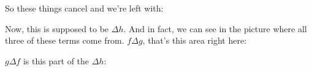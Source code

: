 \documentclass[pdftex, brazil, 12pt, twoside]{article}
\begin{document}
So these things cancel and we're left
with:

\begin{figure}[H]
  \begin{center}
  \end{center}
\end{figure}

Now, this is supposed to be $\Delta h$.
And in fact, we can see in the picture
where all three of these terms come from.
$f\Delta g$, that's this area right here:

\begin{figure}[H]
  \begin{center}
  \end{center}
\end{figure}

$g\Delta f$ is this part of the $\Delta h$:
\end{document}
